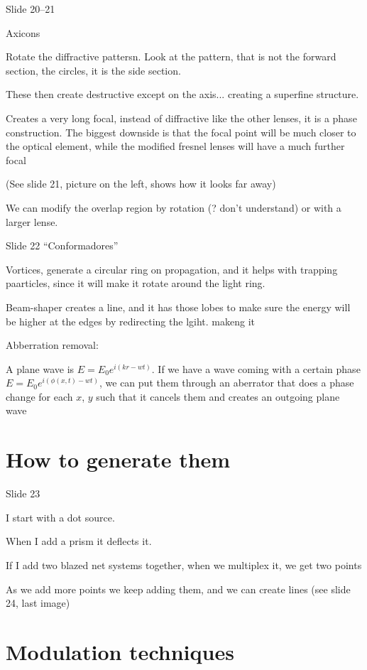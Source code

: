\documentclass[../main/main.tex]{subfiles}
\begin{document}
Slide 20--21

Axicons

Rotate the diffractive pattersn. Look at the pattern, that is not the forward section, the circles, it is the side section.

These then create destructive except on the axis... creating a superfine structure.

Creates a very long focal, instead of diffractive like the other lenses, it is a phase construction. The biggest downside is that the focal point will be much closer to the optical element, while the modified fresnel lenses will have a much further focal

(See slide 21, picture on the left, shows how it looks far away)

We can modify the overlap region by rotation (? don't understand) or with a larger lense.

Slide 22
``Conformadores''

Vortices, generate a circular ring on propagation, and it helps with trapping paarticles, since it will make it rotate around the light ring.

Beam-shaper creates a line, and it has those lobes to make sure the energy will be higher at the edges by redirecting the lgiht. makeng it

Abberration removal:

A plane wave is $E = E_{0}e^{i(kr-wt)}$. If we have a wave coming with a certain phase $E = E_{0}e^{i(\phi(x,t)-wt)}$, we can put them through an aberrator that does a phase change for each $x$, $y$ such that it cancels them and creates an outgoing plane wave


\section{How to generate them}

Slide 23

I start with a dot source.

When I add a prism it deflects it.

If I add two blazed net systems together, when we multiplex it, we get two points

As we add more points we keep adding them, and we can create lines (see slide 24, last image)


\section{Modulation techniques}
\end{document}
